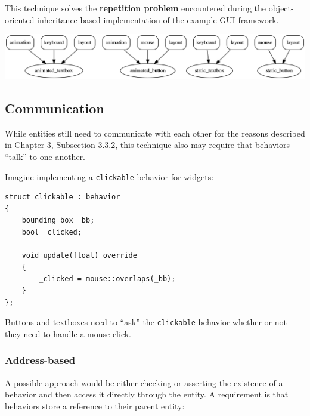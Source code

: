 \documentclass[oneside, 12pt, a4paper, openany]{book}
\let\origfigure=\figure
\let\endorigfigure=\endfigure
\renewenvironment{figure}[1][]{%
\origfigure[H]
}{%
\endorigfigure
}
\begin{document}
This technique solves the \textbf{repetition problem} encountered during
the object-oriented inheritance-based implementation of the example GUI
framework.

\begin{figure}[htbp]
\centering
\includegraphics{source/figures/generated/ecs/overview/oop_composition/example_gui_0.png}
\caption{Object-oriented composition: GUI entity hierarchy}
\end{figure}

\subsection{Communication}\label{communication}

While entities still need to communicate with each other for the reasons
described in \protect\hyperlink{chapter_oop_communication}{Chapter 3,
Subsection 3.3.2}, this technique also may require that behaviors
``talk'' to one another.

Imagine implementing a
\texttt{clickable}
behavior for widgets:

\begin{verbatim}
struct clickable : behavior
{
    bounding_box _bb;
    bool _clicked;

    void update(float) override
    {
        _clicked = mouse::overlaps(_bb);
    }
};
\end{verbatim}

Buttons and textboxes need to ``ask'' the
\texttt{clickable}
behavior whether or not they need to handle a mouse click.

\subsubsection{Address-based}\label{address-based-1}

A possible approach would be either checking or asserting the existence
of a behavior and then access it directly through the entity. A
requirement is that behaviors store a reference to their parent entity:
\end{document}
